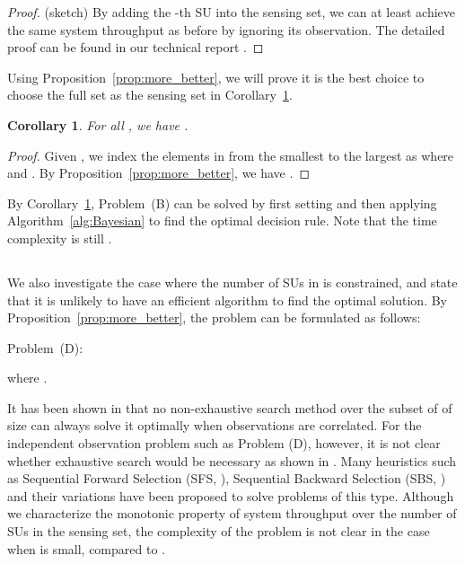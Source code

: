 \documentclass[conference]{IEEEtran}
\newtheorem{corollary}[theorem]{Corollary}
\begin{document}
\begin{proof}
(sketch) By adding the -th SU into the sensing set, we can at least achieve the same system throughput as before by ignoring its observation. The detailed proof can be found in our technical report \cite{Li2011}.
\end{proof}




Using Proposition~\ref{prop:more_better}, we will prove it is the best choice to choose the full set as the sensing set in Corollary~\ref{cor:full_best}.

\begin{corollary}
\label{cor:full_best}
For all , we have .
\end{corollary}

\begin{proof}
Given , we index the elements in  from the smallest to the largest as  where  and . By Proposition~\ref{prop:more_better}, we have .
\end{proof}

By Corollary~\ref{cor:full_best}, Problem~(B) can be solved by first setting  and then applying Algorithm~\ref{alg:Bayesian} to find the optimal decision rule. Note that the time complexity is still .

\subsection{}
\label{subsec:exhaustive}

We also investigate the case where the number of SUs in  is constrained, and state that it is unlikely to have an efficient algorithm to find the optimal solution. By Proposition~\ref{prop:more_better}, the problem can be formulated as follows:

Problem~(D):
\vspace{-0.8em}




where .

It has been shown in \cite{Pena} that no non-exhaustive search method over the subset of  of size  can always solve it optimally when observations are correlated. For the independent observation problem such as Problem (D), however, it is not clear whether exhaustive search would be necessary as shown in \cite{Van}. Many heuristics such as Sequential Forward Selection (SFS, \cite{SFS}), Sequential Backward Selection (SBS, \cite{SFS}) and their variations \cite{Kudo} have been proposed to solve problems of this type. Although we characterize the monotonic property of system throughput over the number of SUs in the sensing set, the complexity of the problem is not clear in the case when  is small, compared to .
\end{document}
